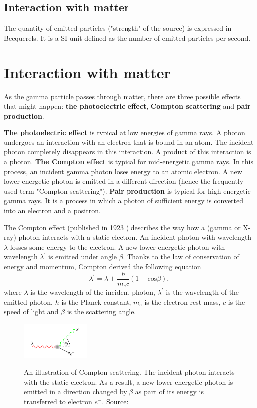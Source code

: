 \subsection{Interaction with matter}

The quantity of emitted particles ("strength" of the source) is expressed in Becquerels.
It is a SI unit defined as the number of emitted particles per second.

\section{Interaction with matter}
As the gamma particle passes through matter, there are three possible effects that might happen:
\textbf{the photoelectric effect}, \textbf{Compton scattering} and \textbf{pair production}.

\textbf{The photoelectric effect} is typical at low energies of gamma rays. A photon undergoes an interaction with an electron that is bound in an atom. The incident photon completely disappears in this interaction. A product of this interaction is a photon.
\textbf{The Compton effect} is typical for mid-energetic gamma rays. In this process, an incident gamma photon loses energy to an atomic electron. A new lower energetic photon is emitted in a different direction (hence the frequently used term "Compton scattering").
\textbf{Pair production} is typical for high-energetic gamma rays. It is a process in which a photon of sufficient energy is converted into an electron and a positron.

The Compton effect (published in 1923 \cite{}) describes the way how a (gamma or X-ray) photon interacts with a static electron. An incident photon with wavelength $\lambda$ losses some energy to the electron. A new lower energetic photon with wavelength $\lambda^{\prime}$ is emitted under angle $\beta$. Thanks to the law of conservation of energy and momentum, Compton derived the following equation
\begin{equation}
    \lambda^{\prime} = \lambda + \frac{h}{m_{e}c}(1-\mathrm{cos} \beta),
\end{equation}
where $\lambda$ is the wavelength of the incident photon, $\lambda^{\prime}$ is the wavelength of the emitted photon, $h$ is the Planck constant, $m_{e}$ is the electron rest mass, $c$ is the speed of light and $\beta$ is the scattering angle.

\begin{figure}[!h]
    \centering
    \includegraphics[width=0.3\textwidth]{./fig/photos/scattering.png}
    \label{fig:scattering}
    \caption{An illustration of Compton scattering. The incident photon interacts with the static electron. As a result, a new lower energetic photon is emitted in a direction changed by $\beta$ as part of its energy is transferred to electron $e^{-}$. Source: \cite{baca2021gamma}}
\end{figure}


